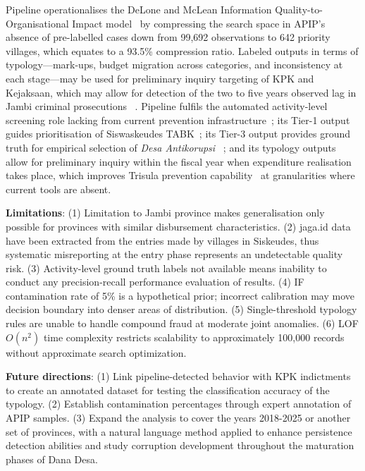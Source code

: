 \documentclass[3p,times,procedia]{elsarticle}
\begin{document}
Pipeline operationalises the DeLone and McLean Information Quality-to-Organisational Impact model~\cite{ref31} by compressing the search space in APIP’s absence of pre-labelled cases down from 99,692 observations to 642 priority villages, which equates to a 93.5\% compression ratio. Labeled outputs in terms of typology—mark-ups, budget migration across categories, and inconsistency at each stage—may be used for preliminary inquiry targeting of KPK and Kejaksaan, which may allow for detection of the two to five years observed lag in Jambi criminal prosecutions ~\cite{ref15,ref16,ref17,ref18}. Pipeline fulfils the automated activity-level screening role lacking from current prevention infrastructure~\cite{ref7}; its Tier-1 output guides prioritisation of Siswaskeudes TABK~\cite{ref6}; its Tier-3 output provides ground truth for empirical selection of \textit{Desa Antikorupsi} ~\cite{ref5}; and its typology outputs allow for preliminary inquiry within the fiscal year when expenditure realisation takes place, which improves Trisula prevention capability~\cite{ref4} at granularities where current tools are absent.

\textbf{Limitations}: (1) Limitation to Jambi province makes generalisation only possible for provinces with similar disbursement characteristics. (2) jaga.id data have been extracted from the entries made by villages in Siskeudes, thus systematic misreporting at the entry phase represents an undetectable quality risk. (3) Activity-level ground truth labels not available means inability to conduct any precision-recall performance evaluation of results. (4) IF contamination rate of 5\% is a hypothetical prior; incorrect calibration may move decision boundary into denser areas of distribution. (5) Single-threshold typology rules are unable to handle compound fraud at moderate joint anomalies. (6) LOF $O(n^2)$ time complexity restricts scalability to approximately 100,000 records without approximate search optimization.

\textbf{Future directions}: (1) Link pipeline-detected behavior with KPK indictments to create an annotated dataset for testing the classification accuracy of the typology. (2) Establish contamination percentages through expert annotation of APIP samples. (3) Expand the analysis to cover the years 2018-2025 or another set of provinces, with a natural language method applied to enhance persistence detection abilities and study corruption development throughout the maturation phases of Dana Desa.

\end{document}
